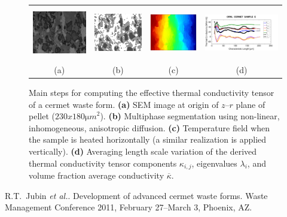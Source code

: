 \begin{figure}
\centering
\begin{tabular}{cccc}
\includegraphics[height=0.9in]{./almeida/cermet-SEM.png} &
\includegraphics[height=0.8in]{./almeida/cermet-phases.png} &
\includegraphics[height=0.8in]{./almeida/cermet-xtfield.png} &
\includegraphics[height=0.8in]{./almeida/cermet-ktensor.png}
\\
(a) & (b) & (c) & (d)
\end{tabular}

\caption[Anisotropic thermal conductivity of cermet nuclear waste]{Main steps for computing the effective thermal conductivity tensor of a cermet waste form. \textbf{(a)} SEM image at origin of $z$--$r$ plane of pellet (${230x180\mathrm{\mu}m}^{2}$). \textbf{(b)} Multiphase segmentation using non-linear, inhomogeneous, anisotropic diffusion. \textbf{(c)} Temperature field when the sample is heated horizontally (a similar realization is applied vertically). \textbf{(d)} Averaging length scale variation of the derived thermal conductivity tensor components $\kappa_{i,j}$, eigenvalues $\lambda_i$, and volume fraction average conductivity $\overline{\kappa}$.}
\end{figure}


\begin{thebibliography}{10}
{\sc R.T.~Jubin \emph{et al.}}. {Development of advanced cermet waste forms}. Waste Management Conference 2011, February 27--March 3, Phoenix, AZ.
\end{thebibliography}
